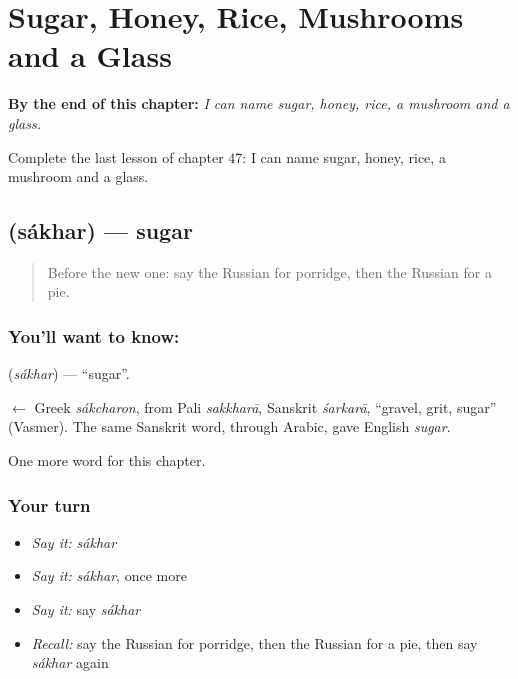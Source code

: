 
\chapter{Sugar, Honey, Rice, Mushrooms and a Glass}
\label{ch:ru-sugar-honey-rice-mushrooms-and-a-glass}

\begin{chapteropening}
\textbf{By the end of this chapter:} \emph{I can name sugar, honey, rice, a mushroom and a glass.}

Complete the last lesson of chapter 47: I can name sugar, honey, rice, a mushroom and a glass.
\end{chapteropening}

\section[\texorpdfstring{\ru{сахар} (sákhar)}{сахар (sákhar)}]{ (sákhar) — sugar}

\label{lesson:RU-C47-sugar}



\begin{quote}
Before the new one: say the Russian for porridge, then the Russian for a pie.
\end{quote}

\subsection*{You'll want to know: }
\textbf{} (\emph{sákhar}) — \textquotedblleft{}sugar\textquotedblright{}.

\begin{cousinweb}
\textbf{} $\leftarrow$ Greek \emph{sákcharon}, from Pali \emph{sakkharā}, Sanskrit \emph{śarkarā}, \textquotedblleft{}gravel, grit, sugar\textquotedblright{} (Vasmer). The same Sanskrit word, through Arabic, gave English \emph{sugar}.
\end{cousinweb}

\begin{grammarlens}[title={What you've built}]
One more word for this chapter.
\end{grammarlens}

\subsection*{Your turn}
\begin{itemize}
\raggedright
  \item \emph{Say it:} \emph{sákhar}
  \item \emph{Say it:} \emph{sákhar}, once more
  \item \emph{Say it:} say \emph{sákhar}
  \item \emph{Recall:} say the Russian for porridge, then the Russian for a pie, then say \emph{sákhar} again
\end{itemize}

